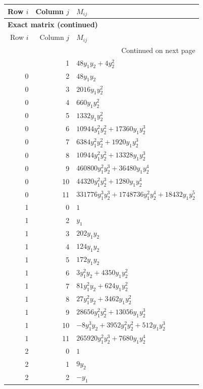 \documentclass[10pt,a4paper]{article}
\begin{document}
{\small\setlength{\tabcolsep}{7pt}\begin{longtable}{rrp{125mm}}
\toprule Row $i$ & Column $j$ & $M_{ij}$\\\midrule\endfirsthead
\multicolumn{3}{l}{\textbf{Exact matrix (continued)}}\\
\toprule Row $i$ & Column $j$ & $M_{ij}$\\\midrule\endhead
\midrule\multicolumn{3}{r}{Continued on next page}\\\endfoot\bottomrule\endlastfoot
0 & 1 & $48 y_{1} y_{2} + 4 y_{2}^{2}$\\
0 & 2 & $48 y_{1} y_{2}$\\
0 & 3 & $2016 y_{1} y_{2}^{2}$\\
0 & 4 & $660 y_{1} y_{2}^{2}$\\
0 & 5 & $1332 y_{1} y_{2}^{2}$\\
0 & 6 & $10944 y_{1}^{2} y_{2}^{2} + 17360 y_{1} y_{2}^{3}$\\
0 & 7 & $6384 y_{1}^{2} y_{2}^{2} + 1920 y_{1} y_{2}^{3}$\\
0 & 8 & $10944 y_{1}^{2} y_{2}^{2} + 13328 y_{1} y_{2}^{3}$\\
0 & 9 & $460800 y_{1}^{2} y_{2}^{3} + 36480 y_{1} y_{2}^{4}$\\
0 & 10 & $44320 y_{1}^{2} y_{2}^{3} + 1280 y_{1} y_{2}^{4}$\\
0 & 11 & $331776 y_{1}^{3} y_{2}^{3} + 1748736 y_{1}^{2} y_{2}^{4} + 18432 y_{1} y_{2}^{5}$\\
1 & 0 & $1$\\
1 & 2 & $y_{1}$\\
1 & 3 & $202 y_{1} y_{2}$\\
1 & 4 & $124 y_{1} y_{2}$\\
1 & 5 & $172 y_{1} y_{2}$\\
1 & 6 & $3 y_{1}^{2} y_{2} + 4350 y_{1} y_{2}^{2}$\\
1 & 7 & $81 y_{1}^{2} y_{2} + 624 y_{1} y_{2}^{2}$\\
1 & 8 & $27 y_{1}^{2} y_{2} + 3462 y_{1} y_{2}^{2}$\\
1 & 9 & $28656 y_{1}^{2} y_{2}^{2} + 13056 y_{1} y_{2}^{3}$\\
1 & 10 & $- 8 y_{1}^{3} y_{2} + 3952 y_{1}^{2} y_{2}^{2} + 512 y_{1} y_{2}^{3}$\\
1 & 11 & $265920 y_{1}^{2} y_{2}^{3} + 7680 y_{1} y_{2}^{4}$\\
2 & 0 & $1$\\
2 & 1 & $9 y_{2}$\\
2 & 2 & $- y_{1}$\\

\end{longtable}}
\end{document}
